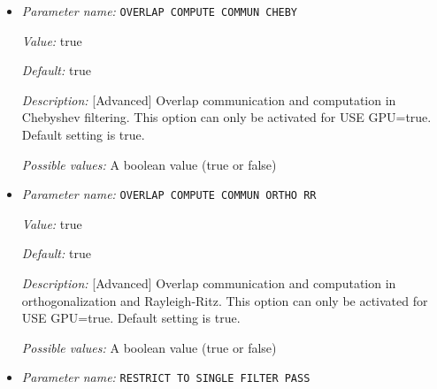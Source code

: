 \begin{itemize}
{\it Value:} Auto


{\it Default:} Auto


{\it Description:} [Advanced] Parameter specifying the type of orthogonalization to be used: GS(Gram-Schmidt Orthogonalization using SLEPc library) and CGS(Cholesky-Gram-Schmidt Orthogonalization). Auto is the default and recommended option, which chooses GS for all-electron case and CGS for pseudopotential case. On GPUs CGS is the only route currently implemented.


{\it Possible values:} Any one of GS, CGS, Auto
\item {\it Parameter name:} {\tt OVERLAP COMPUTE COMMUN CHEBY}
\label{parameters:SCF parameters/Eigen_2dsolver parameters/OVERLAP COMPUTE COMMUN CHEBY}
\label{parameters:SCF_20parameters/Eigen_2dsolver_20parameters/OVERLAP_20COMPUTE_20COMMUN_20CHEBY}


{\it Value:} true


{\it Default:} true


{\it Description:} [Advanced] Overlap communication and computation in Chebyshev filtering. This option can only be activated for USE GPU=true. Default setting is true.


{\it Possible values:} A boolean value (true or false)
\item {\it Parameter name:} {\tt OVERLAP COMPUTE COMMUN ORTHO RR}
\label{parameters:SCF parameters/Eigen_2dsolver parameters/OVERLAP COMPUTE COMMUN ORTHO RR}
\label{parameters:SCF_20parameters/Eigen_2dsolver_20parameters/OVERLAP_20COMPUTE_20COMMUN_20ORTHO_20RR}


{\it Value:} true


{\it Default:} true


{\it Description:} [Advanced] Overlap communication and computation in orthogonalization and Rayleigh-Ritz. This option can only be activated for USE GPU=true. Default setting is true.


{\it Possible values:} A boolean value (true or false)
\item {\it Parameter name:} {\tt RESTRICT TO SINGLE FILTER PASS}
\label{parameters:SCF parameters/Eigen_2dsolver parameters/RESTRICT TO SINGLE FILTER PASS}
\label{parameters:SCF_20parameters/Eigen_2dsolver_20parameters/RESTRICT_20TO_20SINGLE_20FILTER_20PASS}



\end{itemize}
